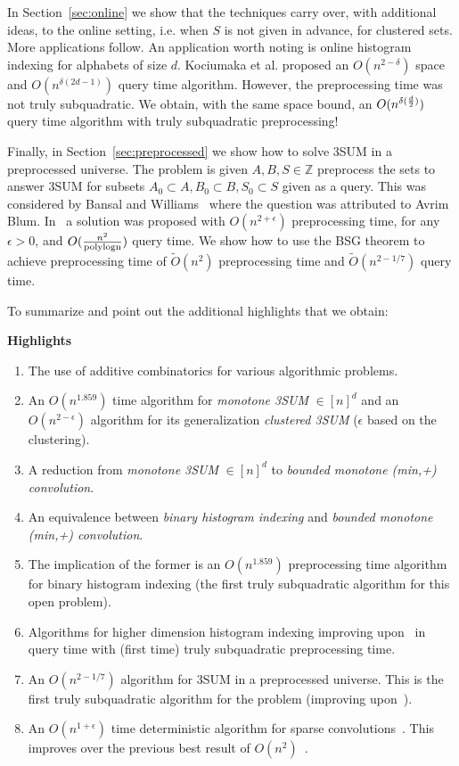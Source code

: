 \documentclass[11pt]{article}
\newcommand{\Z}{\mathbb{Z}}
\newcommand{\polylog}{\rm{polylog}}
\begin{document}
{In Section~\ref{sec:online} we show that the techniques carry over, with additional ideas, to the online setting, i.e. when $S$ is not given in advance, for clustered sets. More applications follow. An application worth noting is online histogram indexing for alphabets of size $d$. Kociumaka et al. proposed an $O(n^{2-\delta})$ space and $O(n^{\delta(2d-1)})$ query time algorithm. However, the preprocessing time was not truly subquadratic. We obtain, with the same space bound, an $O(n^{\delta({d\over 2})})$ query time algorithm with truly subquadratic preprocessing!

Finally, in Section~\ref{sec:preprocessed}  we show how to solve 3SUM in a preprocessed universe. The problem is given $A,B,S \in \Z$ preprocess the sets to answer 3SUM for subsets $A_0 \subset A, B_0 \subset B, S_0 \subset S$ given as a query. This was considered by Bansal and Williams~\cite{BW12} where the question was attributed to Avrim Blum. In~\cite{BW12} a solution was proposed with $O(n^{2+\epsilon})$ preprocessing time, for any $\epsilon>0$, and $O({n^2\over \polylog n})$ query time. We show how to use the BSG theorem to achieve preprocessing time of $\tilde{O}(n^2)$ preprocessing time and $\tilde{O}(n^{2-1/7})$ query time.

\bigskip
To summarize and point out the additional highlights that we obtain:

\bigskip
\noindent
{\bf Highlights}
\begin{enumerate}
\itemsep0em
\item
The use of additive combinatorics for various algorithmic problems.
\item
An $O(n^{1.859})$ time algorithm for {\em monotone 3SUM} $\in [n]^d$ and an $O(n^{2-\epsilon})$ algorithm for its generalization {\em clustered 3SUM} ($\epsilon$ based on the clustering).
\item
A reduction from {\em monotone 3SUM} $\in [n]^d$ to {\em bounded monotone (min,+) convolution}.
\item
An equivalence between {\em binary histogram indexing} and {\em bounded monotone (min,+) convolution}.
\item
The implication of the former is an $O(n^{1.859})$ preprocessing time algorithm for binary histogram indexing (the first truly subquadratic algorithm for this open problem).
\item
Algorithms for higher dimension histogram indexing improving upon~\cite{KRR13} in query time with (first time) truly subquadratic preprocessing time.
\item
An $O(n^{2-1/7})$ algorithm for 3SUM in a preprocessed universe. This is the first truly subquadratic algorithm for the problem (improving upon~\cite{BW12}).
\item
An $O(n^{1+\epsilon})$ time deterministic algorithm for sparse convolutions~\cite{CH02,AKP07}. This improves over the previous best result of $O(n^2)$~\cite{AKP07}.
\end{enumerate}

}
\end{document}
